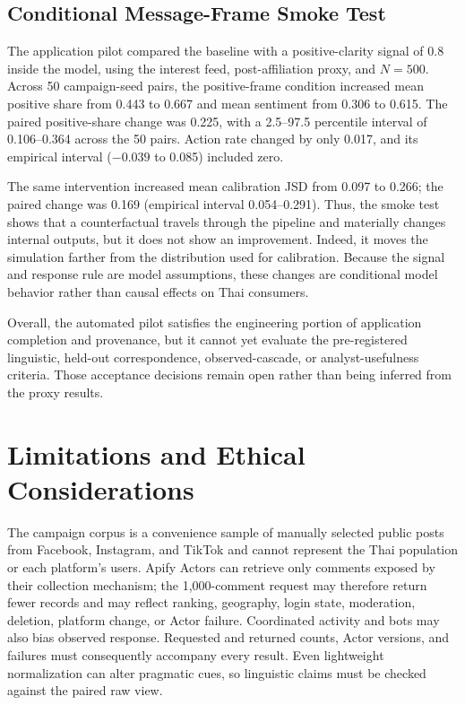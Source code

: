 \documentclass[conference]{IEEEtran}
\begin{document}
\subsection{Conditional Message-Frame Smoke Test}

The application pilot compared the baseline with a positive-clarity signal of
0.8 inside the model, using the interest feed, post-affiliation proxy, and
$N=500$. Across 50 campaign-seed pairs, the positive-frame condition increased
mean positive share from 0.443 to 0.667 and mean sentiment from 0.306 to 0.615.
The paired positive-share change was 0.225, with a 2.5--97.5 percentile interval
of 0.106--0.364 across the 50 pairs. Action rate changed by only 0.017, and its
empirical interval ($-0.039$ to 0.085) included zero.

The same intervention increased mean calibration JSD from 0.097 to 0.266; the
paired change was 0.169 (empirical interval 0.054--0.291). Thus, the smoke test
shows that a counterfactual travels through the pipeline and materially changes
internal outputs, but it does not show an improvement. Indeed, it moves the
simulation farther from the distribution used for calibration. Because the
signal and response rule are model assumptions, these changes are conditional
model behavior rather than causal effects on Thai consumers.

Overall, the automated pilot satisfies the engineering portion of application
completion and provenance, but it cannot yet evaluate the pre-registered
linguistic, held-out correspondence, observed-cascade, or analyst-usefulness
criteria. Those acceptance decisions remain open rather than being inferred
from the proxy results.

\section{Limitations and Ethical Considerations}

The campaign corpus is a convenience sample of manually selected public posts
from Facebook, Instagram, and TikTok and cannot represent the Thai population
or each platform's users. Apify Actors can retrieve only comments exposed by
their collection mechanism; the 1,000-comment request may therefore return
fewer records and may reflect ranking, geography, login state, moderation,
deletion, platform change, or Actor failure. Coordinated activity and bots may
also bias observed response. Requested and returned counts, Actor versions,
and failures must consequently accompany every result. Even lightweight
normalization can alter pragmatic cues, so linguistic claims must be checked
against the paired raw view.
\end{document}
